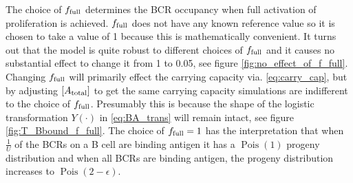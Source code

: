 The choice of $f_{\text{full}}$ determines the BCR occupancy when full activation of proliferation is achieved.
$f_{\text{full}}$ does not have any known reference value so it is chosen to take a value of 1 because this is mathematically convenient.
It turns out that the model is quite robust to different choices of $f_{\text{full}}$ and it causes no substantial effect to change it from 1 to 0.05, see figure \ref{fig:no_effect_of_f_full}.
Changing $f_{\text{full}}$ will primarily effect the carrying capacity via. \eqref{eq:carry_cap}, but by adjusting $[A_{\text{total}}]$ to get the same carrying capacity simulations are indifferent to the choice of $f_{\text{full}}$.
Presumably this is because the shape of the logistic transformation $Y(\cdot)$ in \eqref{eq:BA_trans} will remain intact, see figure \ref{fig:T_Bbound_f_full}.
The choice of $f_{\text{full}} = 1$ has the interpretation that when $\frac{1}{U}$ of the BCRs on a B cell are binding antigen it has a $\operatorname{Pois}(1)$ progeny distribution and when all BCRs are binding antigen, the progeny distribution increases to $\operatorname{Pois}(2-\epsilon)$.
